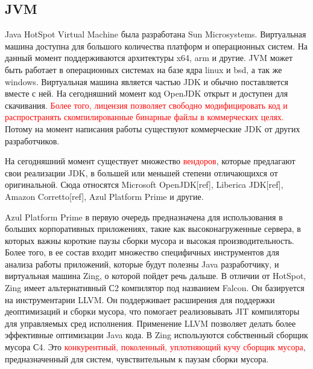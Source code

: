 \subsection{JVM}
Java HotSpot Virtual Machine была разработана Sun Microsystems. Виртуальная машина доступна для большого количества платформ и операционных систем. На данный момент поддерживаются архитектуры x64, arm и другие. JVM может быть работает в операционных системах на базе ядра linux и bsd, а так же windows. Виртуальная машина является частью JDK и обычно поставляется вместе с ней. На сегодняшний момент код OpenJDK открыт и доступен для скачивания. \textcolor{red}{Более того, лицензия позволяет свободно модифицировать код и распространять скомпилированные бинарные файлы в коммерческих целях.} Потому на момент написания работы существуют коммерческие JDK от других разработчиков.
\par
На сегодняшний момент существует множество \textcolor{red}{вендоров}, которые предлагают свои реализации JDK, в большей или меньшей степени отличающихся от оригинальной. Сюда относятся Microsoft OpenJDK[ref], Liberica JDK[ref], Amazon Corretto[ref], Azul Platform Prime и другие.
\par
Azul Platform Prime в первую очередь предназначена для использования в больших корпоративных приложениях, такие как высоконагруженные сервера, в которых важны короткие паузы сборки мусора и высокая производительность. Более того, в ее состав входит множество специфичных инструментов для анализа работы приложений, которые будут полезны Java разработчику, и виртуальная машина Zing, о которой пойдет речь дальше. В отличии от HotSpot, Zing имеет альтернативный С2 компилятор под названием Falcon. Он базируется на инструментарии LLVM. Он поддерживает расширения для поддержки деоптимизаций и сборки мусора, что помогает реализовывать JIT компиляторы для управляемых сред исполнения. Применение LLVM позволяет делать более эффективные оптимизации Java кода. В Zing используются собственный сборщик мусора С4. Это \textcolor{red}{конкурентный, поколенный, уплотняющий кучу сборщик мусора}, предназначенный для систем, чувствительным к паузам сборки мусора.

